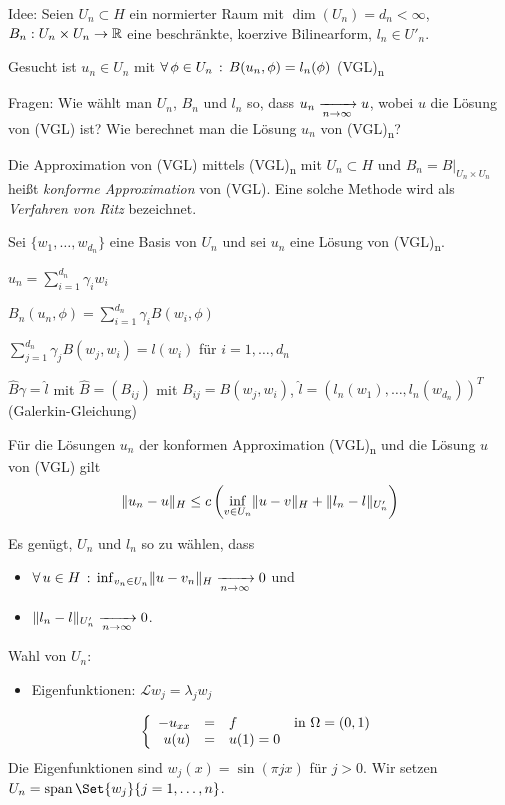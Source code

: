 \documentclass{cheat-sheet}
\newcommand{\LL}{\mathcal{L}} %
\newcommand{\tss}[1]{\textsubscript{#1}} %
\DeclareMathOperator{\spann}{span} %
\begin{document}
Idee: Seien $U_n \subset H$ ein normierter Raum mit $\dim(U_n) = d_n < \infty$, $B_n : U_n \times U_n \to \mathbb{R}$ eine beschränkte, koerzive Bilinearform, $l_n \in U'_n.$

Gesucht ist $u_n \in U_n$ mit $\forall \, {\phi \in U_n} \,:\, B(u_n, \phi) = l_n(\phi)$ (VGL)\tss{n}

Fragen: Wie wählt man $U_n$, $B_n$ und $l_n$ so, dass $u_n \xrightarrow[n \to \infty]{} u$, wobei $u$ die Lösung von (VGL) ist?
Wie berechnet man die Lösung $u_n$ von (VGL)\tss{n}?

\begin{defn}
  Die Approximation von (VGL) mittels (VGL)\tss{n} mit $U_n \subset H$ und $B_n = B|_{U_n \times U_n}$ heißt \emph{konforme Approximation} von (VGL).
  Eine solche Methode wird als \emph{Verfahren von Ritz} bezeichnet.
\end{defn}

Sei $\{ w_1, \ldots, w_{d_n} \}$ eine Basis von $U_n$ und sei $u_n$ eine Lösung von (VGL)\tss{n}.

$u_n = \sum_{i=1}^{d_n} \gamma_i w_i$

$B_n(u_n, \phi) = \sum_{i=1}^{d_n} \gamma_i B(w_i, \phi)$

$\sum_{j=1}^{d_n} \gamma_j B(w_j, w_i) = l(w_i)$ für $i = 1, \ldots, d_n$

$\hat{B} \gamma = \hat{l}$ mit $\hat{B} = (B_{ij})$ mit $B_{ij} = B(w_j, w_i)$, $\hat{l} = (l_n(w_1), \ldots, l_n(w_{d_n}))^T$ (Galerkin-Gleichung)

\begin{satz}
  Für die Lösungen $u_n$ der konformen Approximation (VGL)\tss{n} und die Lösung $u$ von (VGL) gilt
  \[ \lVert u_n - u\rVert_H \leq c \left( \inf_{v \in U_n} \lVert u - v\rVert_H + \lVert l_n - l\rVert_{U_n'} \right) \]
\end{satz}

\begin{folgerung}
  Es genügt, $U_n$ und $l_n$ so zu wählen, dass
  \begin{itemize}
    \item $\forall \, {u \in H} \,:\, \inf_{v_n \in U_n} \lVert u - v_n\rVert_H \xrightarrow[n \to \infty]{} 0$ und
    \item $\lVert l_n - l\rVert_{U'_n} \xrightarrow[n \to \infty]{} 0$.
  \end{itemize}
\end{folgerung}

Wahl von $U_n$:
\begin{itemize}
  \item Eigenfunktionen: $\LL w_j = \lambda_j w_j$
\end{itemize}

\begin{bsp}
  \[
    \left\{ \begin{array}{r c l l}
      - u_{xx} & = & f & \text{in } \Omega = \left( 0, 1 \right) \\
      u(u) & = & u(1) = 0
    \end{array} \right.
  \]
  Die Eigenfunktionen sind $w_j(x) = \sin(\pi j x)$ für $j > 0$.
  Wir setzen $U_n = \spann \Set{w_j}{j = 1, \ldots, n}$.
\end{bsp}
\end{document}
